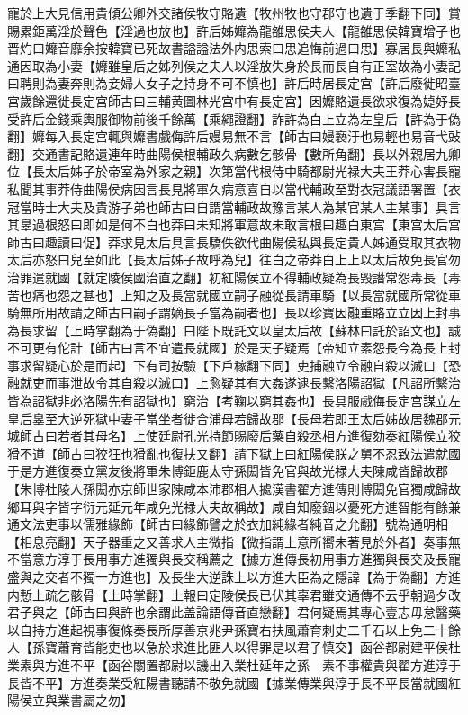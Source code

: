 寵於上大見信用貴傾公卿外交諸侯牧守賂遺【牧州牧也守郡守也遺于季翻下同】賞賜累鉅萬淫於聲色【淫過也放也】許后姊孊為龍雒思侯夫人【龍雒思侯韓寶增子也晋灼曰孊音靡余按韓寶已死故書謚謚法外内思索曰思追悔前過曰思】寡居長與孊私通因取為小妻【孊雖皇后之姊列侯之夫人以淫放失身於長而長自有正室故為小妻記曰聘則為妻奔則為妾婦人女子之持身不可不慎也】許后時居長定宫【許后廢徙昭臺宫歲餘還徙長定宫師古曰三輔黄圖林光宫中有長定宫】因孊賂遺長欲求復為媫妤長受許后金錢乘輿服御物前後千餘萬【乘繩證翻】詐許為白上立為左皇后【許為于偽翻】孊每入長定宫輒與孊書戲侮許后嫚易無不言【師古曰嫚䙝汙也易輕也易音弋䜴翻】交通書記賂遺連年時曲陽侯根輔政久病數乞骸骨【數所角翻】長以外親居九卿位【長太后姊子於帝室為外家之親】次第當代根侍中騎都尉光禄大夫王莽心害長寵私聞其事莽侍曲陽侯病因言長見將軍久病意喜自以當代輔政至對衣冠議語署置【衣冠當時士大夫及貴游子弟也師古曰自謂當輔政故豫言某人為某官某人主某事】具言其辠過根怒曰即如是何不白也莽曰未知將軍意故未敢言根曰趣白東宫【東宫太后宫師古曰趣讀曰促】莽求見太后具言長驕佚欲代曲陽侯私與長定貴人姊通受取其衣物太后亦怒曰兒至如此【長太后姊子故呼為兒】往白之帝莽白上上以太后故免長官勿治罪遣就國【就定陵侯國治直之翻】初紅陽侯立不得輔政疑為長毁譖常怨毒長【毒苦也痛也怨之甚也】上知之及長當就國立嗣子融從長請車騎【以長當就國所常從車騎無所用故請之師古曰嗣子謂嫡長子當為嗣者也】長以珍寶因融重賂立立因上封事為長求留【上時掌翻為于偽翻】曰陛下既託文以皇太后故【蘇林曰託於詔文也】誠不可更有佗計【師古曰言不宜遣長就國】於是天子疑焉【帝知立素怨長今為長上封事求留疑心於是而起】下有司按驗【下戶稼翻下同】吏捕融立令融自殺以滅口【恐融就吏而事泄故令其自殺以滅口】上愈疑其有大姦遂逮長繫洛陽詔獄【凡詔所繫治皆為詔獄非必洛陽先有詔獄也】窮治【考鞠以窮其姦也】長具服戲侮長定宫謀立左皇后辠至大逆死獄中妻子當坐者徙合浦母若歸故郡【長母若即王太后姊故居魏郡元城師古曰若者其母名】上使廷尉孔光持節賜廢后藥自殺丞相方進復劾奏紅陽侯立狡猾不道【師古曰狡狂也猾亂也復扶又翻】請下獄上曰紅陽侯朕之舅不忍致法遣就國于是方進復奏立黨友後將軍朱博鉅鹿太守孫閎皆免官與故光禄大夫陳咸皆歸故郡【朱博杜陵人孫閎亦京師世家陳咸本沛郡相人㨿漢書翟方進傳則博閎免官獨咸歸故鄉耳與字皆字衍元延元年咸免光禄大夫故稱故】咸自知廢錮以憂死方進智能有餘兼通文法吏事以儒雅緣飾【師古曰緣飾譬之於衣加純緣者純音之允翻】號為通明相【相息亮翻】天子器重之又善求人主微指【微指謂上意所嚮未著見於外者】奏事無不當意方淳于長用事方進獨與長交稱薦之【據方進傳長初用事方進獨與長交及長寵盛與之交者不獨一方進也】及長坐大逆誅上以方進大臣為之隱諱【為于偽翻】方進内慙上疏乞骸骨【上時掌翻】上報曰定陵侯長已伏其辜君雖交通傳不云乎朝過夕改君子與之【師古曰與許也余謂此盖論語傳音直戀翻】君何疑焉其專心壹志毋怠醫藥以自持方進起視事復條奏長所厚善京兆尹孫寶右扶風蕭育刺史二千石以上免二十餘人【孫寶蕭育皆能吏也以急於求進比匪人以得罪是以君子慎交】函谷都尉建平侯杜業素與方進不平【函谷關置都尉以譏出入業杜延年之孫　素不事權貴與翟方進淳于長皆不平】方進奏業受紅陽書聽請不敬免就國【據業傳業與淳于長不平長當就國紅陽侯立與業書屬之勿】


